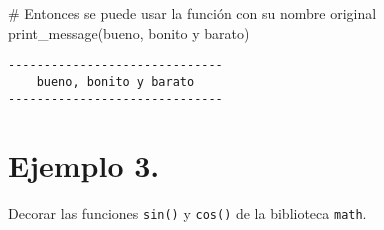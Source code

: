 \documentclass[
  letterpaper,
  DIV=11,
  numbers=noendperiod]{scrreprt}
\newenvironment{Shaded}{\begin{snugshade}}{\end{snugshade}}
\newcommand{\CommentTok}[1]{\textcolor[rgb]{0.37,0.37,0.37}{#1}}
\newcommand{\NormalTok}[1]{\textcolor[rgb]{0.00,0.23,0.31}{#1}}
\newcommand{\StringTok}[1]{\textcolor[rgb]{0.13,0.47,0.30}{#1}}
\begin{document}
\begin{Shaded}
\begin{Highlighting}[]
\CommentTok{\# Entonces se puede usar la función con su nombre original}
\NormalTok{print\_message(}\StringTok{\textquotesingle{}bueno, bonito y barato\textquotesingle{}}\NormalTok{)}
\end{Highlighting}
\end{Shaded}

\begin{verbatim}
------------------------------
    bueno, bonito y barato    
------------------------------
\end{verbatim}

\section{\texorpdfstring{\textbf{Ejemplo
3.}}{Ejemplo 3.}}\label{ejemplo-3.-3}

Decorar las funciones \texttt{sin()} y \texttt{cos()} de la biblioteca
\texttt{math}.
\end{document}
